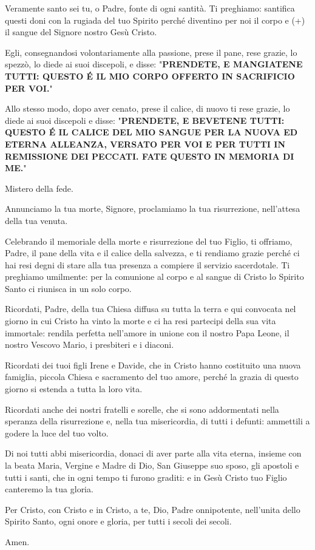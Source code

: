 	\begin{dialoghi}
		\item[\sacerdote] Veramente santo sei tu, o Padre, fonte di ogni santità. Ti preghiamo: santifica questi doni con la rugiada del tuo Spirito perché diventino per noi il corpo e (+) il sangue del Signore nostro Gesù Cristo.

		Egli, consegnandosi volontariamente alla passione, prese il pane, rese grazie, lo spezzò, lo diede ai suoi discepoli, e disse: "\textbf{PRENDETE, E MANGIATENE TUTTI: QUESTO É IL MIO CORPO OFFERTO IN SACRIFICIO PER VOI.}"

		Allo stesso modo, dopo aver cenato, prese il calice, di nuovo ti rese grazie, lo diede ai suoi discepoli e disse: "\textbf{PRENDETE, E BEVETENE TUTTI: QUESTO É IL CALICE DEL MIO SANGUE PER LA NUOVA ED ETERNA ALLEANZA, VERSATO PER VOI E PER TUTTI IN REMISSIONE DEI PECCATI. FATE QUESTO IN MEMORIA DI ME.}"

		Mistero della fede.
		\item[\assemblea] Annunciamo la tua morte, Signore, proclamiamo la tua risurrezione, nell'attesa della tua venuta.
		\item[\sacerdote] Celebrando il memoriale della morte e risurrezione del tuo Figlio, ti offriamo, Padre, il pane della vita e il calice della salvezza, e ti rendiamo grazie perché ci hai resi degni di stare alla tua presenza a compiere il servizio sacerdotale. Ti preghiamo umilmente: per la comunione al corpo e al sangue di Cristo lo Spirito Santo ci riunisca in un solo corpo.

		Ricordati, Padre, della tua Chiesa diffusa su tutta la terra e qui convocata nel giorno in cui Cristo ha vinto la morte e ci ha resi partecipi della sua vita immortale: rendila perfetta nell'amore in unione con il nostro Papa Leone, il nostro Vescovo Mario, i presbiteri e i diaconi.

		Ricordati dei tuoi figli Irene e Davide, che in Cristo hanno costituito una nuova famiglia, piccola Chiesa e sacramento del tuo amore, perché la grazia di questo giorno si estenda a tutta la loro vita.

		Ricordati anche dei nostri fratelli e sorelle, che si sono addormentati nella speranza della risurrezione e, nella tua misericordia, di tutti i defunti: ammettili a godere la luce del tuo volto.

		Di noi tutti abbi misericordia, donaci di aver parte alla vita eterna, insieme con la beata Maria, Vergine e Madre di Dio, San Giuseppe suo sposo, gli apostoli e tutti i santi, che in ogni tempo ti furono graditi: e in Gesù Cristo tuo Figlio canteremo la tua gloria.

		Per Cristo, con Cristo e in Cristo, a te, Dio, Padre onnipotente, nell'unita dello Spirito Santo, ogni onore e gloria, per tutti i secoli dei secoli.
		\item[\assemblea] Amen.
	\end{dialoghi}